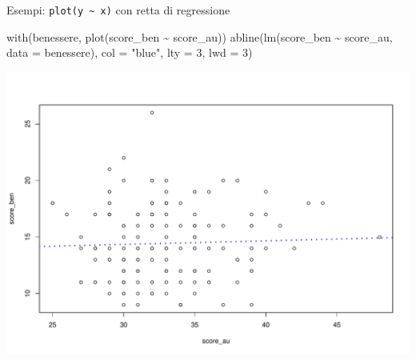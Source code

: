 \documentclass[
  ignorenonframetext,
]{beamer}
\newenvironment{Shaded}{\begin{snugshade}}{\end{snugshade}}
\newcommand{\AttributeTok}[1]{\textcolor[rgb]{0.00,0.34,0.68}{#1}}
\newcommand{\DecValTok}[1]{\textcolor[rgb]{0.69,0.50,0.00}{#1}}
\newcommand{\FunctionTok}[1]{\textcolor[rgb]{0.39,0.29,0.61}{#1}}
\newcommand{\NormalTok}[1]{\textcolor[rgb]{0.12,0.11,0.11}{#1}}
\newcommand{\SpecialCharTok}[1]{\textcolor[rgb]{0.24,0.68,0.91}{#1}}
\newcommand{\StringTok}[1]{\textcolor[rgb]{0.75,0.01,0.01}{#1}}
\begin{document}
\begin{frame}[fragile]{Esempi: \texttt{plot(y\ \textasciitilde{}\ x)}
con retta di regressione}
\protect\hypertarget{esempi-ploty-x-con-retta-di-regressione}{}
\begin{Shaded}
\begin{Highlighting}[]
\FunctionTok{with}\NormalTok{(benessere, }
     \FunctionTok{plot}\NormalTok{(score\_ben }\SpecialCharTok{\textasciitilde{}}\NormalTok{ score\_au))}
\FunctionTok{abline}\NormalTok{(}\FunctionTok{lm}\NormalTok{(score\_ben }\SpecialCharTok{\textasciitilde{}}\NormalTok{ score\_au, }\AttributeTok{data =}\NormalTok{ benessere), }
          \AttributeTok{col =} \StringTok{"blue"}\NormalTok{, }\AttributeTok{lty =} \DecValTok{3}\NormalTok{, }\AttributeTok{lwd =} \DecValTok{3}\NormalTok{)}
\end{Highlighting}
\end{Shaded}

\begin{center}\includegraphics[width=0.7\linewidth]{Practice_files/figure-beamer/unnamed-chunk-41-1} \end{center}
\end{frame}
\end{document}
